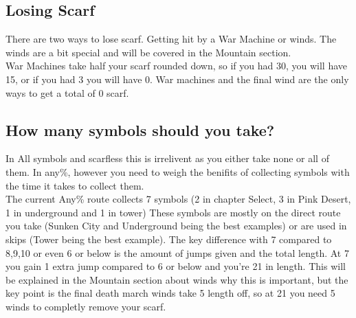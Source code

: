 \begin{table}[h]
\centering
{}
\caption{Amount of jumps with each length lookup table}
\label{tab:symbols-robes-jumps}
\end{table}

\subsection*{Losing Scarf}
There are two ways to lose scarf. Getting hit by a War Machine or winds. The winds are a bit special and will be covered
in the Mountain section.\\
War Machines take half your scarf rounded down, so if you had 30, you will have 15, or if you had 3 you will have 0.
War machines and the final wind are the only ways to get a total of 0 scarf.\\

\subsection*{How many symbols should you take?}
In All symbols and scarfless this is irrelivent as you either take none or all of them. In any\%, 
however you need to weigh the benifits of collecting symbols with the time it takes to collect them.\\
The current Any\% route collects 7 symbols (2 in chapter Select, 3 in Pink Desert, 1 in underground and 1 in tower)
These symbols are mostly on the direct route you take (Sunken City and Underground being the best examples) 
or are used in skips (Tower being the best example). The key difference with 7 compared to 8,9,10 or even 6 or below
is the amount of jumps given and the total length. At 7 you gain 1 extra jump compared to 6 or below and you're
21 in length. This will be explained in the Mountain section about winds why this is important, but the key point
is the final death march winds take 5 length off, so at 21 you need 5 winds to completly remove your scarf.

\newpage
